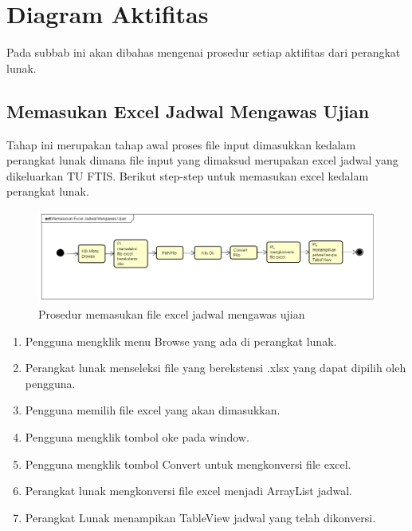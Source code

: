 \section{Diagram Aktifitas}
Pada subbab ini akan dibahas mengenai prosedur setiap aktifitas dari perangkat lunak.

\subsection{Memasukan Excel Jadwal Mengawas Ujian}
Tahap ini merupakan tahap awal proses file input dimasukkan kedalam perangkat lunak dimana file input yang dimaksud merupakan excel jadwal yang dikeluarkan TU FTIS. Berikut step-step untuk memasukan excel kedalam perangkat lunak.
\begin{figure}[h]
	\centering
	\includegraphics[scale=0.3]{Gambar/Memasukan-Excel-Jadwal-Mengawas-Ujian}
	\caption{Prosedur memasukan file excel jadwal mengawas ujian}
	\end{figure}
	
\begin{enumerate}
	\item Pengguna mengklik menu Browse yang ada di perangkat lunak. 
	\item Perangkat lunak menseleksi file yang berekstensi .xlsx yang dapat dipilih oleh pengguna.
	\item Pengguna memilih file excel yang akan dimasukkan.
	\item Pengguna mengklik tombol oke pada window.
	\item Pengguna mengklik tombol Convert untuk mengkonversi file excel.
	\item Perangkat lunak mengkonversi file excel menjadi ArrayList jadwal.
	\item Perangkat Lunak menampikan TableView jadwal yang telah dikonversi. 
\end{enumerate}


